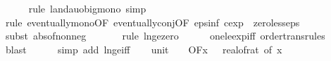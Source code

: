 \begin{isabellebody}
\ \ \ \ \isamarkupfalse%
\ {\isacharparenleft}{\kern0pt}rule\ landau{\isacharunderscore}{\kern0pt}o{\isachardot}{\kern0pt}big{\isacharunderscore}{\kern0pt}mono{\isacharcomma}{\kern0pt}\ simp{\isacharparenright}{\kern0pt}\isanewline
\ \ \ \ \isamarkupfalse%
\ {\isacharparenleft}{\kern0pt}rule\ eventually{\isacharunderscore}{\kern0pt}mono{\isacharbrackleft}{\kern0pt}OF\ eventually{\isacharunderscore}{\kern0pt}conj{\isacharbrackleft}{\kern0pt}OF\ eps{\isacharunderscore}{\kern0pt}inf{\isacharbrackleft}{\kern0pt}\ c{\isacharequal}{\kern0pt}{\isachardoublequoteopen}exp\ {}{\isachardoublequoteclose}{\isacharbrackright}{\kern0pt}\ zero{\isacharunderscore}{\kern0pt}less{\isacharunderscore}{\kern0pt}eps{\isacharbrackright}{\kern0pt}{\isacharbrackright}{\kern0pt}{\isacharparenright}{\kern0pt}\isanewline
\ \ \ \ \isamarkupfalse%
\ {\isacharparenleft}{\kern0pt}subst\ abs{\isacharunderscore}{\kern0pt}of{\isacharunderscore}{\kern0pt}nonneg{\isacharparenright}{\kern0pt}\isanewline
\ \ \ \ \ \isamarkupfalse%
\ {\isacharparenleft}{\kern0pt}rule\ ln{\isacharunderscore}{\kern0pt}ge{\isacharunderscore}{\kern0pt}zero{\isacharparenright}{\kern0pt}\isanewline
\ \ \ \ \isamarkupfalse%
\ one{\isacharunderscore}{\kern0pt}le{\isacharunderscore}{\kern0pt}exp{\isacharunderscore}{\kern0pt}iff\ order{\isacharunderscore}{\kern0pt}trans{\isacharunderscore}{\kern0pt}rules{\isacharparenleft}{\kern0pt}{}{}{\isacharparenright}{\kern0pt}\ \isamarkupfalse%
\ blast\isanewline
\ \ \ \ \isamarkupfalse%
\ {\isacharparenleft}{\kern0pt}simp\ add{\isacharcolon}{\kern0pt}\ ln{\isacharunderscore}{\kern0pt}ge{\isacharunderscore}{\kern0pt}iff{\isacharparenright}{\kern0pt}\isanewline
\isanewline
\ \ \isamarkupfalse%
\ unit{\isacharunderscore}{\kern0pt}{}{\isacharcolon}{\kern0pt}\ {\isachardoublequoteopen}{\isacharparenleft}{\kern0pt}{\isasymlambda}{\isacharunderscore}{\kern0pt}{\isachardot}{\kern0pt}\ {}{\isacharparenright}{\kern0pt}\ {\isasymin}\ O{\isacharbrackleft}{\kern0pt}{\isacharquery}{\kern0pt}F{\isacharbrackright}{\kern0pt}{\isacharparenleft}{\kern0pt}{\isasymlambda}x{\isachardot}{\kern0pt}\ {}\ {\isacharslash}{\kern0pt}\ real{\isacharunderscore}{\kern0pt}of{\isacharunderscore}{\kern0pt}rat\ {\isacharparenleft}{\kern0pt}{\isasymepsilon}{\isacharunderscore}{\kern0pt}of\ x{\isacharparenright}{\kern0pt}{\isacharparenright}{\kern0pt}{\isachardoublequoteclose}\isanewline
\ \ \ \ \isamarkupfalse%

\end{isabellebody}
